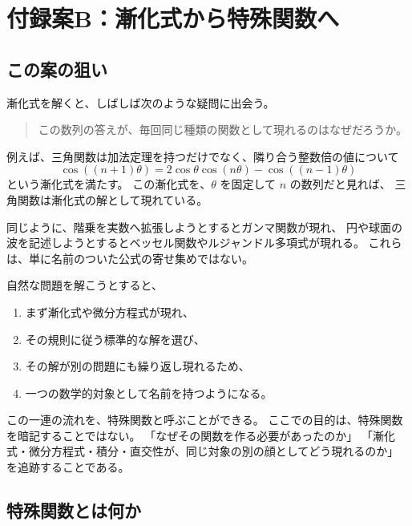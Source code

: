 
\chapter{付録案B：漸化式から特殊関数へ}

\section*{この案の狙い}

漸化式を解くと、しばしば次のような疑問に出会う。

\begin{quote}
  この数列の答えが、毎回同じ種類の関数として現れるのはなぜだろうか。
\end{quote}

例えば、三角関数は加法定理を持つだけでなく、隣り合う整数倍の値について
\[
  \cos((n+1)\theta)
  =2\cos\theta\cos(n\theta)-\cos((n-1)\theta)
\]
という漸化式を満たす。
この漸化式を、$\theta$ を固定して $n$ の数列だと見れば、
三角関数は漸化式の解として現れている。

同じように、階乗を実数へ拡張しようとするとガンマ関数が現れ、
円や球面の波を記述しようとするとベッセル関数やルジャンドル多項式が現れる。
これらは、単に名前のついた公式の寄せ集めではない。

自然な問題を解こうとすると、
\begin{enumerate}
  \item まず漸化式や微分方程式が現れ、
  \item その規則に従う標準的な解を選び、
  \item その解が別の問題にも繰り返し現れるため、
  \item 一つの数学的対象として名前を持つようになる。
\end{enumerate}

この一連の流れを、特殊関数と呼ぶことができる。
ここでの目的は、特殊関数を暗記することではない。
「なぜその関数を作る必要があったのか」
「漸化式・微分方程式・積分・直交性が、同じ対象の別の顔としてどう現れるのか」
を追跡することである。

\section{特殊関数とは何か}

